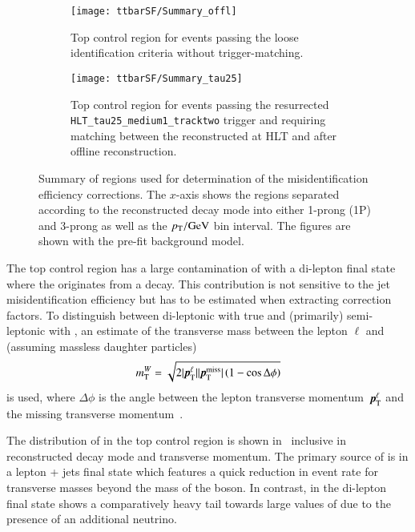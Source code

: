 \begin{figure}[htbp]
  \centering

  \begin{subfigure}[t]{.485\textwidth}
    \texttt{[image: ttbarSF/Summary\_offl]}
    \caption{Top control region for events passing the loose
      \tauhadvis identification criteria without trigger-matching.}
  \end{subfigure}\hfill%
  \begin{subfigure}[t]{.485\textwidth}
    \texttt{[image: ttbarSF/Summary\_tau25]}
    \caption{Top control region for events passing the resurrected
      \texttt{HLT\_tau25\_medium1\_tracktwo} trigger and requiring
      matching between the reconstructed \tauhadvis at HLT and after
      offline \tauhadvis reconstruction.}
  \end{subfigure}

  \caption{Summary of regions used for determination of the \tauhadvis
    misidentification efficiency corrections. The $x$-axis shows the
    regions separated according to the reconstructed decay mode into
    either 1-prong (1P) and 3-prong \tauhadvis as well as the
    \tauhadvis $\pT /\si{\GeV}$ bin interval. The figures are shown
    with the pre-fit background model.}
  \label{fig:ttbarsf_region_summary_prefit}
\end{figure}

The top control region has a large contamination of \ttbar with a
di-lepton final state where the \tauhadvis originates from a \tauhad
decay. This contribution is not sensitive to the jet \ra \tauhadvis
misidentification efficiency but has to be estimated when extracting
correction factors. To distinguish between di-leptonic \ttbar with
true \tauhadvis and (primarily) semi-leptonic \ttbar with
\faketauhadvis, an estimate of the transverse mass between the lepton
$\ell$ and \pTmissAbs (assuming massless daughter particles)
\begin{align*}
  \mTW = \sqrt{2 | \myvec{p}_{\text{T}}^{\ell} | | \pTmiss | \left( 1 - \cos \Delta\phi \right)}
\end{align*}
is used, where $\Delta \phi$ is the angle between the lepton
transverse momentum~$\myvec{p}_{\text{T}}^{\ell}$ and the missing
transverse momentum~\pTmiss.

The distribution of \mTW in the top control region is shown
in~ inclusive in reconstructed \tauhadvis
decay mode and transverse momentum. The primary source of
\faketauhadvis is \ttbar in a lepton + jets final state which features
a quick reduction in event rate for transverse masses beyond the mass
of the \PW boson. In contrast, \ttbar in the di-lepton final state
shows a comparatively heavy tail towards large values of \mTW due to
the presence of an additional neutrino.

